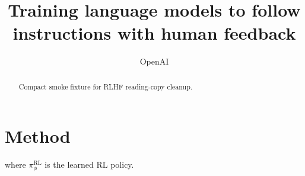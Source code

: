 \documentclass{article}
\begin{document}
\title{Training language models to follow instructions with human feedback}
\author{OpenAI}
\tableofcontents

\begin{abstract}
Compact smoke fixture for RLHF reading-copy cleanup.
\end{abstract}

\section{Method}
where \( \pi_{\phi}^{\mathrm{RL}}\) is the learned RL policy.
\newpage
\end{document}
